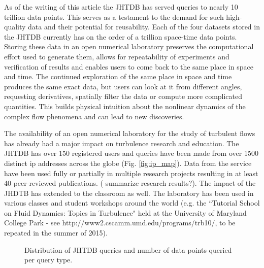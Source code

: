 \documentclass[10pt,twocolumn]{article}
\begin{document}
As of the writing of this article the JHTDB has served queries to nearly 10 trillion data points. This serves as a testament to the demand for such high-quality
data and their potential for reusability. Each of the four datasets stored in the JHTDB currently has on the order of a trillion space-time data points. Storing
these data in an open numerical laboratory preserves the computational effort used to generate them, allows for repeatability of experiments and verification of
results and enables users to come back to the same place in space and time. The continued exploration of the same place in space and time produces
the same exact data, but users can look at it from different angles, requesting derivatives, spatially filter the data or compute more complicated quantities. 
This builds physical intuition about the nonlinear dynamics of the complex flow phenomena and can lead to new discoveries. 

The availability of an open numerical laboratory for the study of turbulent flows has already had a major impact on turbulence research and education. 
The JHTDB has over 150 registered users and queries have been made from over 1500 distinct ip addresses across the globe (Fig. \ref{fig:ip_map}).
Data from the service have been used fully or partially in multiple research projects resulting in at least 40 peer-reviewed publications. ({\color{red} summarize
research results?}). The impact of the JHDTB has extended to the classroom as well. The laboratory has been used in various classes and student workshops 
around the world (e.g. the ``Tutorial School on Fluid Dynamics: Topics in Turbulence" held at the University of Maryland College Park - 
see http://www2.cscamm.umd.edu/programs/trb10/, to be repeated in the summer of 2015).

\begin{figure}
\centering
{}
\caption{Distribution of JHTDB queries and number of data points queried per query type.}
\label{fig:query_types}
\end{figure}
\end{document}

